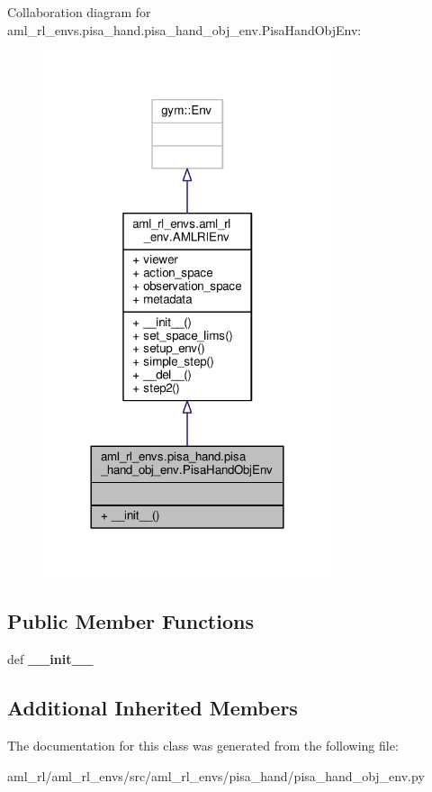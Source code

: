 Collaboration diagram for aml\-\_\-rl\-\_\-envs.\-pisa\-\_\-hand.\-pisa\-\_\-hand\-\_\-obj\-\_\-env.\-Pisa\-Hand\-Obj\-Env\-:
\nopagebreak
\begin{figure}[H]
\begin{center}
\leavevmode
\includegraphics[width=240pt]{classaml__rl__envs_1_1pisa__hand_1_1pisa__hand__obj__env_1_1_pisa_hand_obj_env__coll__graph}
\end{center}
\end{figure}
\subsection*{Public Member Functions}
\begin{DoxyCompactItemize}
\item 
\hypertarget{classaml__rl__envs_1_1pisa__hand_1_1pisa__hand__obj__env_1_1_pisa_hand_obj_env_ab79f466694ec44d0553269eac04ff0e5}{def {\bfseries \-\_\-\-\_\-init\-\_\-\-\_\-}}\label{classaml__rl__envs_1_1pisa__hand_1_1pisa__hand__obj__env_1_1_pisa_hand_obj_env_ab79f466694ec44d0553269eac04ff0e5}

\end{DoxyCompactItemize}
\subsection*{Additional Inherited Members}


The documentation for this class was generated from the following file\-:\begin{DoxyCompactItemize}
\item 
aml\-\_\-rl/aml\-\_\-rl\-\_\-envs/src/aml\-\_\-rl\-\_\-envs/pisa\-\_\-hand/pisa\-\_\-hand\-\_\-obj\-\_\-env.\-py\end{DoxyCompactItemize}
